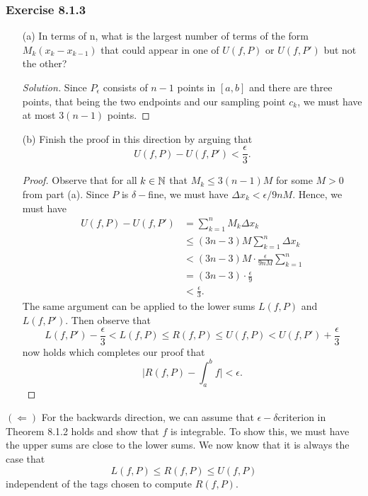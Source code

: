 \subsubsection{Exercise 8.1.3 } 
\begin{enumerate}
    \item[(a)] In terms of n, what is the largest number of terms of the form \( M_{k} ( x_{k } - x_{k-1} ) \) that could appear in one of \( U(f,P)  \) or \( U(f,P') \) but not the other?
        \begin{proof}[Solution]
            Since \( P_{\epsilon } \) consists of \( n-1  \) points in \( [a,b]  \) and there are three points, that being the two endpoints and our sampling point \( c_{k }  \), we must have at most \( 3(n-1)  \) points.
        \end{proof}
    \item[(b)] Finish the proof in this direction by arguing that 
        \[  U(f,P) - U(f,P') < \frac{ \epsilon  }{ 3 }. \]
        \begin{proof}
        Observe that for all \( k \in \mathbb{N}  \) that \( M_{ k } \leq 3(n-1)M   \) for some \( M > 0  \) from part (a). Since \( P  \) is \( \delta- \)fine, we must have \( \Delta x_{k } < \epsilon / 9nM \). Hence, we must have   
        \begin{align*}
            U(f,P) - U(f, P') &= \sum_{ k=1  }^{ n  } M_{k } \Delta x_{ k }  \\
                              &\leq (3n-3)M \sum_{ k=1 }^{ n } \Delta x_{k } \\  
                              &< (3n-3)M \cdot \frac{ \epsilon  }{ 9nM  } \sum_{ k=1 }^{ n } \\
                              &= (3n-3) \cdot \frac{ \epsilon  }{ 9  } \\ 
                              &< \frac{ \epsilon  }{ 3 }.
        \end{align*}
        The same argument can be applied to the lower sums \( L(f,P)  \) and \( L(f,P') \). Then observe that 
        \[   L(f,P') - \frac{ \epsilon  }{ 3 } <  L(f,P) \leq R(f,P) \leq U(f,P) < U(f,P') + \frac{ \epsilon  }{ 3 }  \] now holds which completes our proof that 
        \[ \Big| R(f,P) - \int_{ a }^{ b } f  \Big| < \epsilon. \]
        \end{proof}
\end{enumerate}





\( (\Leftarrow) \) For the backwards direction, we can assume that \( \epsilon -\delta \)criterion in Theorem 8.1.2 holds and show that \( f  \) is integrable. To show this, we must have the upper sums are close to the lower sums. We now know that it is always the case that 
\[  L(f,P) \leq R(f,P) \leq U(f,P) \] independent of the tags chosen to compute \( R(f,P)  \). 
